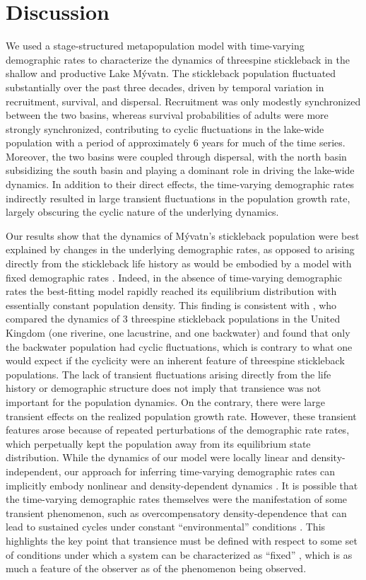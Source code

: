 \documentclass[11pt]{article}
\begin{document}
\section*{Discussion}

We used a stage-structured metapopulation model
with time-varying demographic rates to characterize the
dynamics of threespine stickleback in the shallow and productive Lake M\'{y}vatn.
The stickleback population fluctuated substantially over the past three decades,
driven by  temporal variation in recruitment, survival, and dispersal.
Recruitment was only modestly synchronized between the two basins,
whereas survival probabilities of adults were more strongly synchronized,
contributing to cyclic fluctuations in the lake-wide population
with a period of approximately 6 years for much of the time series.
Moreover, the two basins were coupled through dispersal,
with the north basin subsidizing the south basin and playing a dominant role
in driving the lake-wide dynamics.
In addition to their direct effects, the time-varying demographic rates
indirectly resulted in large transient fluctuations in the population growth rate,
largely obscuring the cyclic nature of the underlying dynamics.

Our results show that the dynamics of M\'{y}vatn's stickleback population
were best explained by changes in the underlying demographic rates,
as opposed to arising directly from the stickleback life history as would be
embodied by a model with fixed demographic rates \citep{caswell2001matrix}.
Indeed, in the absence of time-varying demographic rates the best-fitting model
rapidly reached its equilibrium distribution with essentially constant population density.
This finding is consistent with \cite{wootton2005},
who compared the dynamics of 3 threespine stickleback populations in the United Kingdom
(one riverine, one lacustrine, and one backwater)
and found that only the backwater population had cyclic fluctuations,
which is contrary to what one would expect if the cyclicity were
an inherent feature of threespine stickleback populations.
The lack of transient fluctuations arising directly
from the life history or demographic structure
does not imply that transience was not important for the population dynamics.
On the contrary,
there were large transient effects on the realized population growth rate.
However, these transient features arose because of repeated perturbations
of the demographic rate rates, which perpetually kept the population
away from its equilibrium state distribution.
While the dynamics of our model were locally linear and density-independent,
our approach for inferring time-varying demographic rates can implicitly embody
nonlinear and density-dependent dynamics \citep{ives2012}.
It is possible that the time-varying demographic rates themselves were the manifestation
of some transient phenomenon,
such as overcompensatory density-dependence that can lead to sustained cycles under
constant ``environmental'' conditions
\citep[e.g.,][]{may1974}.
This highlights the key point that transience must be defined with respect to some
set of conditions under which a system can be characterized as ``fixed''
\citep{hastings2010},
which is as much a feature of the observer as of the phenomenon being observed.
\end{document}
